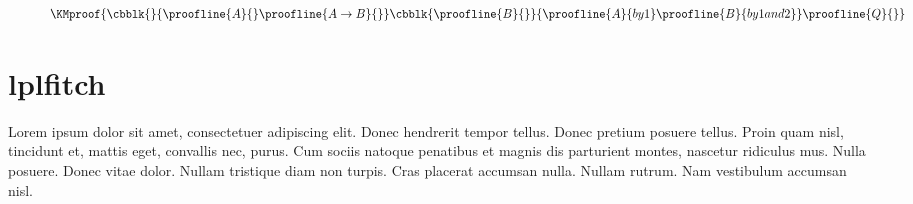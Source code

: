 \documentclass[class=article, crop=false]{standalone}
\begin{document}
\begin{figure}[hb]
\[
  \KMproof{
    \cbblk{}{
      \proofline{A}{}
      \proofline{A \rightarrow B}{}
    }
    \cbblk{
      \proofline{B}{}
    }{
      \proofline{A}{by 1}
      \proofline{B}{by 1 and 2}
    }
    \proofline{Q}{}
  }
\]
\caption{\label{eq:nd1}}
\end{figure}


\pagebreak
\section*{lplfitch}

Lorem ipsum dolor sit amet, consectetuer adipiscing elit.  Donec hendrerit
tempor tellus.  Donec pretium posuere tellus.  Proin quam nisl, tincidunt et,
mattis eget, convallis nec, purus.  Cum sociis natoque penatibus et magnis dis
parturient montes, nascetur ridiculus mus.  Nulla posuere.  Donec vitae dolor.
Nullam tristique diam non turpis.  Cras placerat accumsan nulla.  Nullam rutrum.
Nam vestibulum accumsan nisl.

\begin{figure}[hb]
  \centering
  \caption{\label{eq:lpl1}}
\end{figure}


\IfStandalone{
  \nocite{*}
  
  
  }{}
\end{document}
